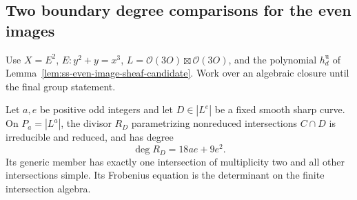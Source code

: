 \subsection{Two boundary degree comparisons for the even images}
\label{subsec:ss-all-even-groups-candidate}

Use $X=E^2$, $E:y^2+y=x^3$, $L=\mathcal O(3O)\boxtimes\mathcal O(3O)$,
and the polynomial $h_d^{\mathrm u}$ of
Lemma~\ref{lem:ss-even-image-sheaf-candidate}.
Work over an algebraic closure until the final group statement.

\begin{lemma}
\label{lem:ss-intersection-Hasse-degree-candidate}
Let $a,e$ be positive odd integers and let $D\in|L^e|$ be a fixed
smooth sharp curve. On $P_a=|L^a|$, the divisor $R_D$ parametrizing
nonreduced intersections $C\cap D$ is irreducible and reduced,
and has degree
\[
                       \deg R_D=18ae+9e^2.
\]
Its generic member has exactly one intersection of multiplicity
two and all other intersections simple. Its Frobenius equation
is the determinant on the finite intersection algebra.
\end{lemma}

